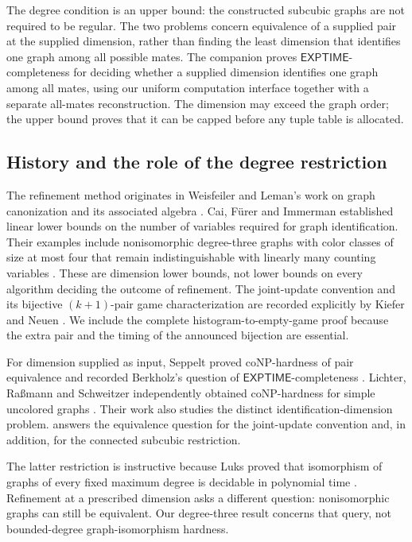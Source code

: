 \documentclass[11pt]{article}
\theoremstyle{definition}
\newcommand{\EXPTIME}{\mathsf{EXPTIME}}
\begin{document}
The degree condition is an upper bound: the constructed subcubic graphs
are not required to be regular. The two problems concern equivalence
of a supplied pair at the supplied dimension, rather than finding the
least dimension that identifies one graph among all possible mates.
The companion \citep[Theorem~1.1]{CompanionIdentification}
proves \(\EXPTIME\)-completeness for deciding whether a supplied
dimension identifies one graph among all mates, using our uniform
computation interface together with a separate all-mates reconstruction.
The dimension may exceed the graph order; the upper bound proves that
it can be capped before any tuple table is allocated.

\subsection{History and the role of the degree restriction}

The refinement method originates in Weisfeiler and Leman's work on
graph canonization and its associated algebra \citep{WeisfeilerLeman1968}.
Cai, F{\"u}rer and Immerman established linear lower bounds on the
number of variables required for graph identification. Their examples
include nonisomorphic degree-three graphs with color classes of size at most
four that remain indistinguishable with linearly many counting variables
\citep[Theorem~5.2 and Corollary~6.5]{CaiFurerImmerman1992}.
These are dimension lower bounds, not lower bounds on every algorithm
deciding the outcome of refinement. The joint-update convention and its
bijective \((k+1)\)-pair game characterization are recorded explicitly by
Kiefer and Neuen \citep[Section~2.2 and Theorem~1]{KieferNeuen2019}.
We include the complete histogram-to-empty-game proof because the
extra pair and the timing of the announced bijection are essential.

For dimension supplied as input, Seppelt proved coNP-hardness of
pair equivalence and recorded Berkholz's question of
\(\EXPTIME\)-completeness
\citep[Theorem~5 and the preceding question, p.~82:3]{Seppelt2024}.
Lichter, Ra{\ss}mann and Schweitzer independently obtained coNP-hardness
for simple uncolored graphs
\citep[Theorem~19]{LichterRassmannSchweitzer2025}.
Their work also studies the distinct identification-dimension problem.
 answers the equivalence question for the joint-update
convention and, in addition, for the connected subcubic restriction.

The latter restriction is instructive because Luks proved that
isomorphism of graphs of every fixed maximum degree is decidable in
polynomial time \citep{Luks1982}. Refinement at a prescribed dimension
asks a different question: nonisomorphic graphs can still be equivalent.
Our degree-three result concerns that query, not bounded-degree
graph-isomorphism hardness.
\end{document}

